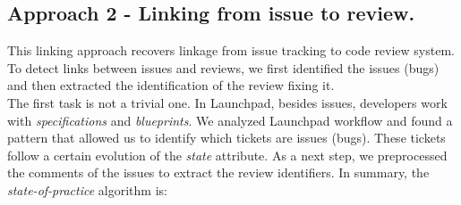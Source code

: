 \documentclass[conference,compsoc]{IEEEtran}
\begin{document}
\subsection{Approach 2 - Linking from issue to review.}
This linking approach recovers linkage from issue tracking 
to code review system. To detect links between issues and reviews, we first identified 
the issues (bugs) and then extracted the identification of the review fixing it.
\\
The first task is not a trivial one. In Launchpad, besides issues, 
developers work with \textit{specifications} and \textit{blueprints}. 
We analyzed Launchpad workflow and found a pattern that allowed us 
to identify which tickets are issues (bugs). These tickets follow a certain 
evolution of the \emph{state} attribute.
As a next step, we preprocessed the comments of the issues to extract the 
review identifiers.
In summary, the \emph{state-of-practice} algorithm is:
\\
\end{document}
